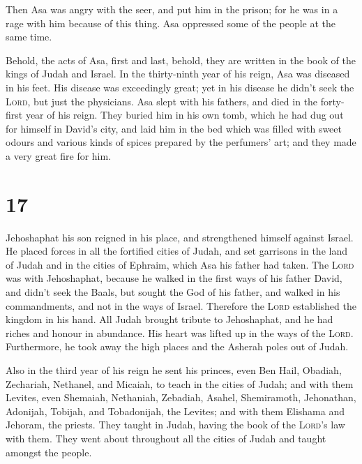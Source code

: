  Then Asa was angry with the seer, and put him in the
prison; for he was in a rage with him because of this thing. Asa
oppressed some of the people at the same time.

 Behold, the acts of Asa, first and last, behold, they
are written in the book of the kings of Judah and Israel.
 In the thirty-ninth year of his reign, Asa was diseased
in his feet. His disease was exceedingly great; yet in his disease he
didn't seek the \textsc{Lord}, but just the physicians. 
Asa slept with his fathers, and died in the forty-first year of his
reign.  They buried him in his own tomb, which he had dug
out for himself in David's city, and laid him in the bed which was
filled with sweet odours and various kinds of spices prepared by the
perfumers' art; and they made a very great fire for him.

\hypertarget{section-16}{%
\section{17}\label{section-16}}

 Jehoshaphat his son reigned in his place, and
strengthened himself against Israel.  He placed forces in
all the fortified cities of Judah, and set garrisons in the land of
Judah and in the cities of Ephraim, which Asa his father had taken.
 The \textsc{Lord} was with Jehoshaphat, because he walked
in the first ways of his father David, and didn't seek the Baals,
 but sought the God of his father, and walked in his
commandments, and not in the ways of Israel.  Therefore
the \textsc{Lord} established the kingdom in his hand. All Judah brought
tribute to Jehoshaphat, and he had riches and honour in abundance.
 His heart was lifted up in the ways of the \textsc{Lord}.
Furthermore, he took away the high places and the Asherah poles out of
Judah.

 Also in the third year of his reign he sent his princes,
even Ben Hail, Obadiah, Zechariah, Nethanel, and Micaiah, to teach in
the cities of Judah;  and with them Levites, even
Shemaiah, Nethaniah, Zebadiah, Asahel, Shemiramoth, Jehonathan,
Adonijah, Tobijah, and Tobadonijah, the Levites; and with them Elishama
and Jehoram, the priests.  They taught in Judah, having
the book of the \textsc{Lord}'s law with them. They went about
throughout all the cities of Judah and taught amongst the people.

